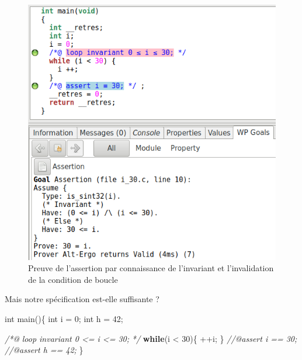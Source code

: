\documentclass[12pt,francais,]{scrbook}
\newenvironment{Shaded}{}{}
\newcommand{\KeywordTok}[1]{\textcolor[rgb]{0.00,0.44,0.13}{\textbf{{#1}}}}
\newcommand{\DataTypeTok}[1]{\textcolor[rgb]{0.56,0.13,0.00}{{#1}}}
\newcommand{\DecValTok}[1]{\textcolor[rgb]{0.25,0.63,0.44}{{#1}}}
\newcommand{\CommentTok}[1]{\textcolor[rgb]{0.38,0.63,0.69}{\textit{{#1}}}}
\newcommand{\NormalTok}[1]{{#1}}
\begin{document}
\begin{figure}[htbp]
\centering
\includegraphics[scale=0.5]{3-3-sortie-boucle.png}
\caption{Preuve de l'assertion par connaissance de l'invariant et
  l'invalidation de la condition de boucle}
\label{fig:3-3-end_loop}
\end{figure}

Mais notre spécification est-elle suffisante ?

\begin{footnotesize}\begin{Shaded}
\begin{Highlighting}[]
\DataTypeTok{int} \NormalTok{main()\{}
  \DataTypeTok{int} \NormalTok{i = }\DecValTok{0}\NormalTok{;}
  \DataTypeTok{int} \NormalTok{h = }\DecValTok{42}\NormalTok{;}
  
  \CommentTok{/*@}
\CommentTok{    loop invariant 0 <= i <= 30;}
\CommentTok{  */}
  \KeywordTok{while}\NormalTok{(i < }\DecValTok{30}\NormalTok{)\{}
    \NormalTok{++i;}
  \NormalTok{\}}
  \CommentTok{//@assert i == 30;}
  \CommentTok{//@assert h == 42;}
\NormalTok{\}}
\end{Highlighting}
\end{Shaded}\end{footnotesize}
\end{document}

